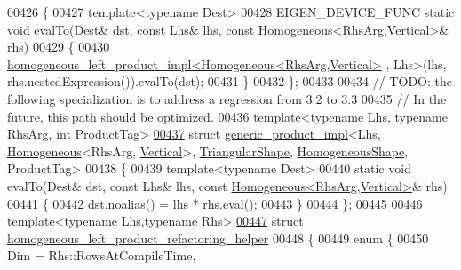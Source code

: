 \begin{DoxyCode}
00426 \{
00427   \textcolor{keyword}{template}<\textcolor{keyword}{typename} Dest>
00428   EIGEN\_DEVICE\_FUNC \textcolor{keyword}{static} \textcolor{keywordtype}{void} evalTo(Dest& dst, \textcolor{keyword}{const} Lhs& lhs, \textcolor{keyword}{const} 
      \hyperlink{group___geometry___module_class_eigen_1_1_homogeneous}{Homogeneous<RhsArg,Vertical>}& rhs)
00429   \{
00430     \hyperlink{struct_eigen_1_1internal_1_1homogeneous__left__product__impl}{homogeneous\_left\_product\_impl<Homogeneous<RhsArg,Vertical>}
      , Lhs>(lhs, rhs.nestedExpression()).evalTo(dst);
00431   \}
00432 \};
00433 
00434 \textcolor{comment}{// TODO: the following specialization is to address a regression from 3.2 to 3.3}
00435 \textcolor{comment}{// In the future, this path should be optimized.}
00436 \textcolor{keyword}{template}<\textcolor{keyword}{typename} Lhs, \textcolor{keyword}{typename} RhsArg, \textcolor{keywordtype}{int} ProductTag>
\hyperlink{struct_eigen_1_1internal_1_1generic__product__impl_3_01_lhs_00_01_homogeneous_3_01_rhs_arg_00_0147df2ec49eff7619c8ef7c3518aa8800}{00437} \textcolor{keyword}{struct }\hyperlink{struct_eigen_1_1internal_1_1generic__product__impl}{generic\_product\_impl}<Lhs, \hyperlink{group___geometry___module_class_eigen_1_1_homogeneous}{Homogeneous}<RhsArg,
      \hyperlink{group__enums_ggad49a7b3738e273eb00932271b36127f7addca718e0564723df21d61b94b1198be}{Vertical}>, \hyperlink{struct_eigen_1_1_triangular_shape}{TriangularShape}, \hyperlink{struct_eigen_1_1_homogeneous_shape}{HomogeneousShape}, ProductTag>
00438 \{
00439   \textcolor{keyword}{template}<\textcolor{keyword}{typename} Dest>
00440   \textcolor{keyword}{static} \textcolor{keywordtype}{void} evalTo(Dest& dst, \textcolor{keyword}{const} Lhs& lhs, \textcolor{keyword}{const} 
      \hyperlink{group___geometry___module_class_eigen_1_1_homogeneous}{Homogeneous<RhsArg,Vertical>}& rhs)
00441   \{
00442     dst.noalias() = lhs * rhs.\hyperlink{group___core___module_a5df64c66228ba75bbc66db2584185527}{eval}();
00443   \}
00444 \};
00445 
00446 \textcolor{keyword}{template}<\textcolor{keyword}{typename} Lhs,\textcolor{keyword}{typename} Rhs>
\hyperlink{struct_eigen_1_1internal_1_1homogeneous__left__product__refactoring__helper}{00447} \textcolor{keyword}{struct }\hyperlink{struct_eigen_1_1internal_1_1homogeneous__left__product__refactoring__helper}{homogeneous\_left\_product\_refactoring\_helper}
00448 \{
00449   \textcolor{keyword}{enum} \{
00450     Dim = Rhs::RowsAtCompileTime,

\end{DoxyCode}
